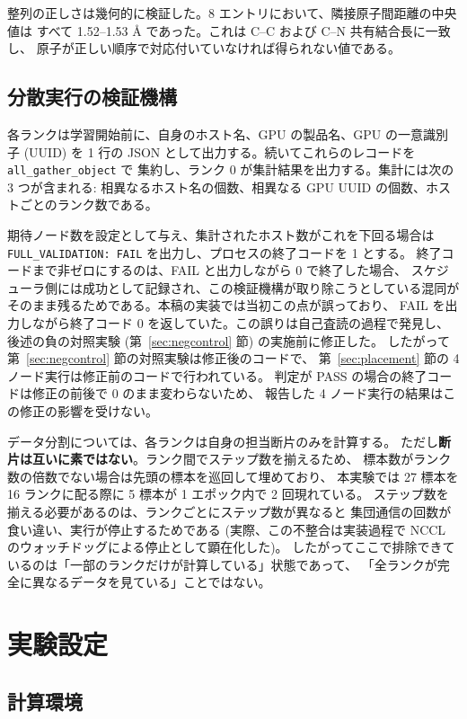 \documentclass[11pt,a4paper]{article}
\begin{document}
整列の正しさは幾何的に検証した。8 エントリにおいて、隣接原子間距離の中央値は
すべて 1.52--1.53 \AA{} であった。これは C--C および C--N 共有結合長に一致し、
原子が正しい順序で対応付いていなければ得られない値である。

\subsection{分散実行の検証機構}

各ランクは学習開始前に、自身のホスト名、GPU の製品名、GPU の一意識別子 (UUID) を
1 行の JSON として出力する。続いてこれらのレコードを \texttt{all\_gather\_object} で
集約し、ランク 0 が集計結果を出力する。集計には次の 3 つが含まれる:
相異なるホスト名の個数、相異なる GPU UUID の個数、ホストごとのランク数である。

期待ノード数を設定として与え、集計されたホスト数がこれを下回る場合は
\texttt{FULL\_VALIDATION: FAIL} を出力し、プロセスの終了コードを 1 とする。
終了コードまで非ゼロにするのは、FAIL と出力しながら 0 で終了した場合、
スケジューラ側には成功として記録され、この検証機構が取り除こうとしている混同が
そのまま残るためである。本稿の実装では当初この点が誤っており、
FAIL を出力しながら終了コード 0 を返していた。この誤りは自己査読の過程で発見し、
後述の負の対照実験 (第~\ref{sec:negcontrol} 節) の実施前に修正した。
したがって第~\ref{sec:negcontrol} 節の対照実験は修正後のコードで、
第~\ref{sec:placement} 節の 4 ノード実行は修正前のコードで行われている。
判定が PASS の場合の終了コードは修正の前後で 0 のまま変わらないため、
報告した 4 ノード実行の結果はこの修正の影響を受けない。

データ分割については、各ランクは自身の担当断片のみを計算する。
ただし\textbf{断片は互いに素ではない}。ランク間でステップ数を揃えるため、
標本数がランク数の倍数でない場合は先頭の標本を巡回して埋めており、
本実験では 27 標本を 16 ランクに配る際に 5 標本が 1 エポック内で 2 回現れている。
ステップ数を揃える必要があるのは、ランクごとにステップ数が異なると
集団通信の回数が食い違い、実行が停止するためである
(実際、この不整合は実装過程で NCCL のウォッチドッグによる停止として顕在化した)。
したがってここで排除できているのは「一部のランクだけが計算している」状態であって、
「全ランクが完全に異なるデータを見ている」ことではない。

\section{実験設定}

\subsection{計算環境}
\end{document}
